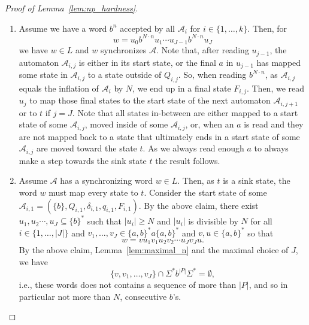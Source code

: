 \begin{toappendix}
\begin{proof}[Proof of Lemma~\ref{lem:np_hardness}]
 \begin{enumerate}
 \item Assume we have a word $b^n$ accepted by all $\mathcal A_i$ for $i \in \{1,\ldots,k\}$. 
 Then, for
 \[
  w = u_0 b^{N\cdot n} u_1 \cdots u_{J-1} b^{N\cdot n} u_J
 \] 
 we have $w \in L$ and $w$ synchronizes $\mathcal A$.
 Note that, after reading $u_{j-1}$,
 the automaton $\mathcal A_{i,j}$
 is either in its start state, or the final $a$ in $u_{j-1}$
 has mapped some state in $\mathcal A_{i,j}$ to a state outside of $Q_{i,j}$.
 So, when reading $b^{N\cdot n}$, 
 as $\mathcal A_{i,j}$ equals  the inflation of $\mathcal A_i$ by $N$,
 we end up in a final state $F_{i,j}$.
 Then, we read $u_j$ to map those final states to the start state
 of the next automaton $\mathcal A_{i,j+1}$ or to $t$ if $j = J$.
 Note that all states in-between are either mapped
 to a start state of some $\mathcal A_{i,j}$, moved inside of some
 $\mathcal A_{i,j}$, or, when an $a$ is read and they are not mapped
 back to a state that ultimately ends in a start state of some $\mathcal A_{i,j}$
 are moved toward the state $t$.
 As we always read enough $a$ to always make a step towards the sink state $t$
 the result follows.
 
 
 
 \item  Assume $\mathcal A$ has a synchronizing word $w \in L$.
  Then, as $t$ is a sink state, the word $w$ must map every state to $t$.
  Consider the start state of some $\mathcal A_{i,1} = (\{b\}, Q_{i,1}, \delta_{i,1}, q_{i,1}, F_{i,1})$.
  By the above claim,  
  there exist $u_1, u_2 \cdots, u_{J} \subseteq \{b\}^*$
  such that $|u_i| \ge N$ and $|u_i|$ is divisible by $N$
  for all $i \in \{1,\ldots,|J|\}$
  and $v_1, \ldots, v_{J} \in \{a,b\}^*a\{a,b\}^*$ and $v, u \in \{a,b\}^*$
  so that 
  \[ 
    w = vu_1 v_1 u_2 v_2 \cdots u_{J} v_{J} u.
  \]
  By the above claim, Lemma~\ref{lem:maximal_n} and the maximal choice of $J$,
  we have 
  \[ 
  \{ v, v_1, \ldots, v_J \} \cap \Sigma^* b^{|P|} \Sigma^* = \emptyset,
  \] 
  i.e.,
  these words does not contains a sequence of more than $|P|$, and so in particular not more than $N$,
  consecutive $b$'s.
  

\end{enumerate}
\end{proof}
\end{toappendix}
